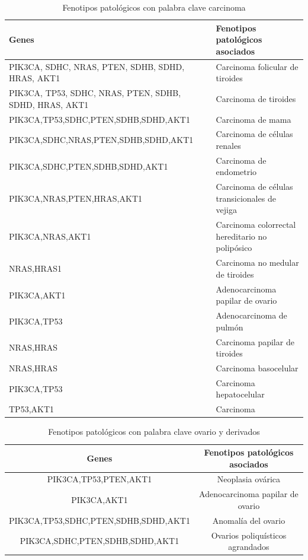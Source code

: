 \begin{table}[h]
	\centering
	\caption{Fenotipos patológicos con palabra clave carcinoma}
	\begin{tabular}{|p{3cm}|p{4cm}|}
		\hline
		\textbf{Genes} & \textbf{Fenotipos patológicos asociados} \\
		\hline
		PIK3CA, SDHC, NRAS, PTEN, SDHB, SDHD, HRAS, AKT1 & Carcinoma folicular de tiroides \\
		\hline
		PIK3CA, TP53, SDHC, NRAS, PTEN, SDHB, SDHD, HRAS, AKT1 & Carcinoma de tiroides \\
		\hline
		PIK3CA,TP53,SDHC,PTEN,SDHB,SDHD,AKT1 & Carcinoma de mama \\
		\hline
		PIK3CA,SDHC,NRAS,PTEN,SDHB,SDHD,AKT1 & Carcinoma de células renales \\
		\hline
		PIK3CA,SDHC,PTEN,SDHB,SDHD,AKT1 & Carcinoma de endometrio \\
		\hline
		PIK3CA,NRAS,PTEN,HRAS,AKT1 & Carcinoma de células transicionales de vejiga \\
		\hline
		PIK3CA,NRAS,AKT1 & Carcinoma colorrectal hereditario no polipósico \\
		\hline
		NRAS,HRAS1 & Carcinoma no medular de tiroides \\
		\hline
		PIK3CA,AKT1 & Adenocarcinoma papilar de ovario \\
		\hline
		PIK3CA,TP53 & Adenocarcinoma de pulmón \\
		\hline
		NRAS,HRAS & Carcinoma papilar de tiroides \\
		\hline
		NRAS,HRAS & Carcinoma basocelular \\
		\hline
		PIK3CA,TP53 & Carcinoma hepatocelular \\
		\hline
		TP53,AKT1 & Carcinoma \\
		\hline
	\end{tabular}
\end{table}

\begin{table}[h]
	\centering
	\caption{Fenotipos patológicos con palabra clave ovario y derivados}
	\begin{tabular}{|c|c|}
		\hline
		\textbf{Genes} & \textbf{Fenotipos patológicos asociados} \\
		\hline
		PIK3CA,TP53,PTEN,AKT1 & Neoplasia ovárica \\
		\hline
		PIK3CA,AKT1 & Adenocarcinoma papilar de ovario \\
		\hline
		PIK3CA,TP53,SDHC,PTEN,SDHB,SDHD,AKT1 & Anomalía del ovario \\
		\hline
		PIK3CA,SDHC,PTEN,SDHB,SDHD,AKT1 & Ovarios poliquísticos agrandados \\
		\hline
	\end{tabular}
\end{table}

